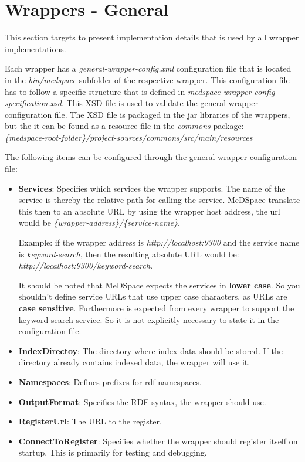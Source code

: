 \section{Wrappers - General}

This section targets to present implementation details that is used by all wrapper implementations.

Each wrapper has a \emph{general-wrapper-config.xml} configuration file that is located in the \emph{bin/medspace} subfolder of the respective wrapper. This configuration file has to follow a specific structure that is defined in \emph{medspace-wrapper-config-specification.xsd}. This XSD file is used to validate the general wrapper configuration file. The XSD file is packaged in the jar libraries of the wrappers, but the it can be found as a resource file in the \emph{commons} package: \\
\emph{\{medspace-root-folder\}/project-sources/commons/src/main/resources}

The following items can be configured through the general wrapper configuration file:
\begin{itemize}
\item \textbf{Services}: Specifies which services the wrapper supports. The name of the service is thereby the relative path for calling the service. MeDSpace translate this then to an absolute URL by using the wrapper host address, the url would be \emph{\{wrapper-address\}/\{service-name\}}. 

Example: if the wrapper address is \emph{http://localhost:9300} and the service  name is \emph{keyword-search}, then the resulting absolute URL would be:\\
\emph{http://localhost:9300/keyword-search}. 

It should be noted that MeDSpace expects the services in \textbf{lower case}. So you shouldn't define service URLs that use upper case characters, as URLs are \textbf{case sensitive}.
Furthermore is expected from every wrapper to support the keyword-search service. So it is not explicitly necessary to state it in the configuration file.

\item \textbf{IndexDirectoy}: The directory where index data should be stored. If the directory already contains indexed data, the wrapper will use it.

\item \textbf{Namespaces}: Defines prefixes for rdf namespaces. 

\item \textbf{OutputFormat}: Specifies the RDF syntax, the wrapper should use.

\item \textbf{RegisterUrl}: The URL to the register.

\item \textbf{ConnectToRegister}: Specifies whether the wrapper should register itself on startup. This is primarily for testing and debugging.
\end{itemize}

